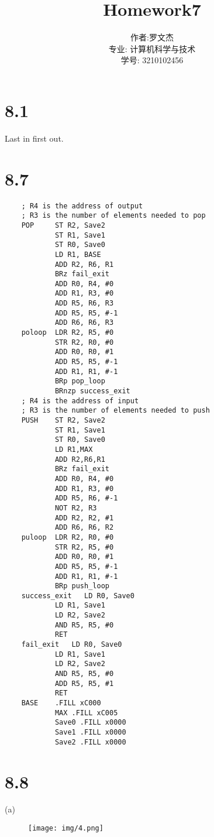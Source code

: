\documentclass[20pt]{ctexart}
\title{Homework7}
\author{作者:罗文杰\\专业: 计算机科学与技术\\学号: 3210102456}
\date{}
\begin{document}
\maketitle

\section*{8.1}
Last in first out.

\section*{8.7}
\begin{verbatim}
    ; R4 is the address of output
    ; R3 is the number of elements needed to pop
    POP     ST R2, Save2 
            ST R1, Save1
            ST R0, Save0
            LD R1, BASE  
            ADD R2, R6, R1 
            BRz fail_exit 
            ADD R0, R4, #0
            ADD R1, R3, #0
            ADD R5, R6, R3
            ADD R5, R5, #-1
            ADD R6, R6, R3
    poloop  LDR R2, R5, #0
            STR R2, R0, #0
            ADD R0, R0, #1
            ADD R5, R5, #-1
            ADD R1, R1, #-1
            BRp pop_loop
            BRnzp success_exit
    ; R4 is the address of input
    ; R3 is the number of elements needed to push
    PUSH    ST R2, Save2 
            ST R1, Save1 
            ST R0, Save0
            LD R1,MAX 
            ADD R2,R6,R1 
            BRz fail_exit 
            ADD R0, R4, #0
            ADD R1, R3, #0
            ADD R5, R6, #-1
            NOT R2, R3
            ADD R2, R2, #1
            ADD R6, R6, R2
    puloop  LDR R2, R0, #0
            STR R2, R5, #0
            ADD R0, R0, #1
            ADD R5, R5, #-1
            ADD R1, R1, #-1
            BRp push_loop
    success_exit   LD R0, Save0
            LD R1, Save1 
            LD R2, Save2 
            AND R5, R5, #0 
            RET
    fail_exit   LD R0, Save0
            LD R1, Save1 
            LD R2, Save2 
            AND R5, R5, #0
            ADD R5, R5, #1
            RET
    BASE    .FILL xC000 
            MAX .FILL xC005
            Save0 .FILL x0000
            Save1 .FILL x0000
            Save2 .FILL x0000
\end{verbatim}

\section*{8.8}
(a)\begin{figure}[H]
    \centering
    \texttt{[image: img/4.png]}
\end{figure}
\end{document}
